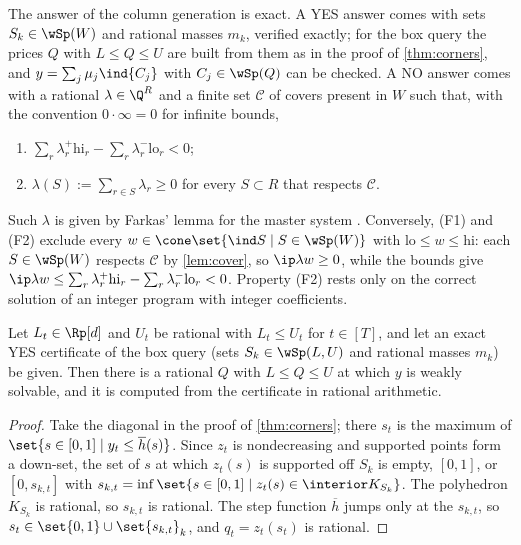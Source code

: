 \begin{proposition}\label{prop:oracle}
The answer of the column generation is exact. A YES answer comes with sets $S_k\in\wSp(W)$ and rational masses $m_k$, verified exactly; for the box query the prices $Q$ with $L\le Q\le U$ are built from them as in the proof of \cref{thm:corners}, and $y=\sum_j\mu_j\ind{C_j}$ with $C_j\in\wSp(Q)$ can be checked. A NO answer comes with a rational $\lambda\in\Q^R$ and a finite set $\mathcal C$ of covers present in $W$ such that, with the convention $0\cdot\infty=0$ for infinite bounds,
\begin{enumerate}[label=(F\arabic*)]
\item $\sum_r\lambda_r^+\mathrm{hi}_r-\sum_r\lambda_r^-\mathrm{lo}_r<0$;
\item $\lambda(S):=\sum_{r\in S}\lambda_r\ge0$ for every $S\subset R$ that respects $\mathcal C$.
\end{enumerate}
Such $\lambda$ is given by Farkas' lemma for the master system \citep[Cor.~7.1d]{Schrijver1986}. Conversely, (F1) and (F2) exclude every $w\in\cone\set{\ind S\mid S\in\wSp(W)}$ with $\mathrm{lo}\le w\le\mathrm{hi}$: each $S\in\wSp(W)$ respects $\mathcal C$ by \cref{lem:cover}, so $\ip\lambda w\ge0$, while the bounds give $\ip\lambda w\le\sum_r\lambda_r^+\mathrm{hi}_r-\sum_r\lambda_r^-\mathrm{lo}_r<0$. Property (F2) rests only on the correct solution of an integer program with integer coefficients.
\end{proposition}

\begin{proposition}\label{prop:rational-Q}
Let $L_t\in\Rp[d]$ and $U_t$ be rational with $L_t\le U_t$ for $t\in[T]$, and let an exact YES certificate of the box query (sets $S_k\in\wSp(L,U)$ and rational masses $m_k$) be given. Then there is a rational $Q$ with $L\le Q\le U$ at which $y$ is weakly solvable, and it is computed from the certificate in rational arithmetic.
\end{proposition}

\begin{proof}
Take the diagonal in the proof of \cref{thm:corners}; there $s_t$ is the maximum of $\set{s\in[0,1]\mid y_t\le\overline h(s)}$. Since $z_t$ is nondecreasing and supported points form a down-set, the set of $s$ at which $z_t(s)$ is supported off $S_k$ is empty, $[0,1]$, or $[0,s_{k,t}]$ with $s_{k,t}=\inf\set{s\in[0,1]\mid z_t(s)\in\interior K_{S_k}}$. The polyhedron $K_{S_k}$ is rational, so $s_{k,t}$ is rational. The step function $\overline h$ jumps only at the $s_{k,t}$, so $s_t\in\set{0,1}\cup\set{s_{k,t}}_k$, and $q_t=z_t(s_t)$ is rational.
\end{proof}
